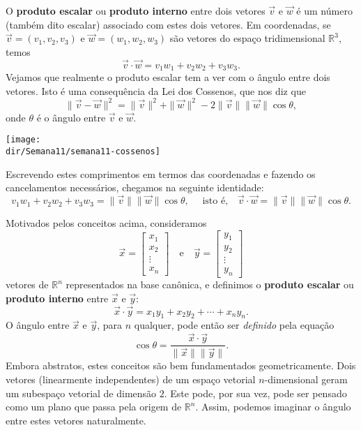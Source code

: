 \documentclass[../livro.tex]{subfiles}  %
\providecommand{\dir}{..}
\begin{document}
O \textbf{produto escalar} ou \textbf{produto interno} entre dois vetores $\vec{v}$ e $\vec{w}$ é um número (também dito escalar) associado com estes dois vetores. Em coordenadas, se $\vec{v} = (v_1, v_2, v_3)$ e $\vec{w} = (w_1, w_2, w_3)$ são vetores do espaço tridimensional $\mathbb{R}^3$, temos
\begin{equation}
\vec{v} \cdot \vec{w} = v_1 w_1 + v_2 w_2 + v_3 w_3.
\end{equation} Vejamos que realmente o produto escalar tem a ver com o ângulo entre dois vetores. Isto é uma consequência da Lei dos Cossenos, que nos diz que
\begin{equation}
\|\vec{v} - \vec{w}\|^2 = \|\vec{v}\|^2 + \|\vec{w}\|^2 - 2 \|\vec{v}\| \|\vec{w}\| \cos \theta,
\end{equation} onde $\theta$ é o ângulo entre $\vec{v}$ e $\vec{w}$. 

	\begin{center}
		\texttt{[image: \\dir/Semana11/semana11-cossenos]}
	\end{center}

\noindent Escrevendo estes comprimentos em termos das coordenadas e fazendo os cancelamentos necessários, chegamos na seguinte identidade:
\begin{equation}
v_1 w_1 + v_2 w_2 + v_3 w_3 = \|\vec{v}\| \|\vec{w}\| \cos \theta, \quad \text{ isto é,} \quad \vec{v} \cdot \vec{w} = \|\vec{v}\| \|\vec{w}\| \cos \theta.
\end{equation}


Motivados pelos conceitos acima, consideramos
\begin{equation}
\vec{x} =
\begin{bmatrix}
x_1 \\ x_2 \\ \vdots \\ x_n
\end{bmatrix} \quad \text{e} \quad \vec{y} =
\begin{bmatrix}
y_1 \\ y_2 \\ \vdots \\ y_n
\end{bmatrix}
\end{equation} vetores de $\mathbb{R}^n$ representados na base canônica, e definimos o \textbf{produto escalar} ou \textbf{produto interno} entre $\vec{x}$ e $\vec{y}$:
\begin{equation}
\vec{x} \cdot \vec{y} = x_1 y_1 + x_2 y_2 + \cdots + x_n y_n.
\end{equation} O ângulo entre $\vec{x}$ e $\vec{y}$, para $n$ qualquer, pode então ser \textit{definido} pela equação
\begin{equation}
\cos \theta = \frac{\vec{x} \cdot \vec{y}}{\|\vec{x}\| \|\vec{y}\|}.
\end{equation} Embora abstratos, estes conceitos são bem fundamentados geometricamente. Dois vetores (linearmente independentes) de um espaço vetorial $n$-dimensional geram um subespaço vetorial de dimensão $2$. Este pode, por sua vez, pode ser pensado como um plano que passa pela origem de $\mathbb{R}^n$. Assim, podemos imaginar o ângulo entre estes vetores naturalmente.
\end{document}
